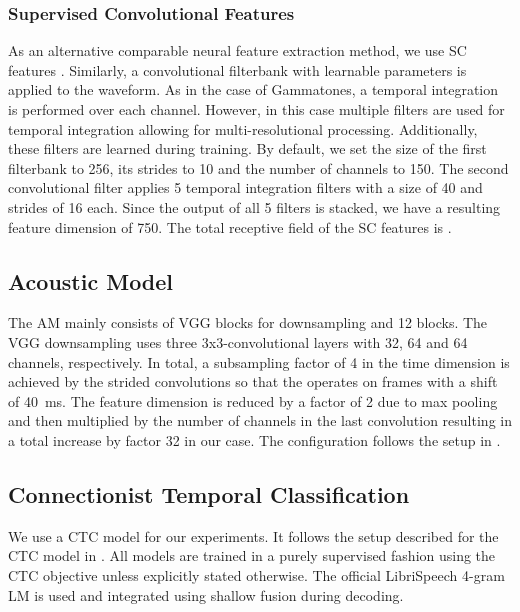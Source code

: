 \documentclass{INTERSPEECH2023}
\begin{document}
\subsubsection{Supervised Convolutional Features}
As an alternative comparable neural feature extraction method, we use \gls{SC} features \cite{tuske2018:waveform, vieting2021waveform}.
Similarly, a convolutional filterbank with learnable parameters is applied to the waveform.
As in the case of Gammatones, a temporal integration is performed over each channel.
However, in this case multiple filters are used for temporal integration allowing for multi-resolutional processing.
Additionally, these filters are learned during training.
By default, we set the size of the first filterbank to 256, its strides to 10 and the number of channels to 150.
The second convolutional filter applies 5 temporal integration filters with a size of 40 and strides of 16 each.
Since the output of all 5 filters is stacked, we have a resulting feature dimension of 750.
The total receptive field of the \gls{SC} features is .

\subsection{Acoustic Model}
The \gls{AM} mainly consists of \gls{VGG} \addref blocks for downsampling and 12 \conformer blocks.
The \gls{VGG} downsampling uses three 3x3-convolutional layers with 32, 64 and 64 channels, respectively.
In total, a subsampling factor of 4 in the time dimension is achieved by the strided convolutions so that the \conformer operates on frames with a shift of \SI{40}{\milli\second}.
The feature dimension is reduced by a factor of 2 due to max pooling and then multiplied by the number of channels in the last convolution resulting in a total increase by factor 32 in our case.
The configuration follows the setup in \cite{zeineldeen2022robustconformer} .

\subsection{Connectionist Temporal Classification}
We use a \gls{CTC} model for our experiments.
It follows the setup described for the \gls{CTC} model in \cite{zhou2022efficient}.
All models are trained in a purely supervised fashion using the \gls{CTC} objective unless explicitly stated otherwise.
The official LibriSpeech 4-gram \gls{LM} is used and integrated using shallow fusion \cite{gulcehre2015shallow} during decoding.
\end{document}
